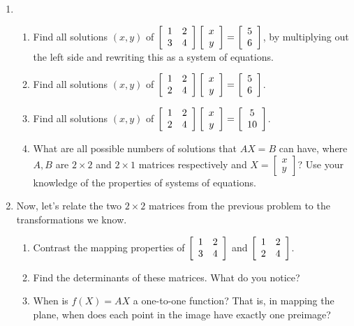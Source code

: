 \documentclass[../gatm.tex]{subfiles}
\begin{document}
\begin{enumerate}
\setcounter{enumi}{\value{problem_i}}
\item \begin{enumerate}
\item \label{prob:needed_for_matrix_undo3}Find all solutions $(x,y)$ of $\left[\begin{array}{cc} 1 & 2 \\ 3 & 4 \end{array}\right]\left[\begin{array}{c} x \\ y \end{array}\right]=\left[\begin{array}{c} 5 \\ 6 \end{array}\right]$, by multiplying out the left side and rewriting this as a system of equations.
\item \label{prob:needed_for_matrix_undo4}Find all solutions $(x,y)$ of $\left[\begin{array}{cc} 1 & 2 \\ 2 & 4 \end{array}\right]\left[\begin{array}{c} x \\ y \end{array}\right]=\left[\begin{array}{c} 5 \\ 6 \end{array}\right]$.
\item Find all solutions $(x,y)$ of $\left[\begin{array}{cc} 1 & 2 \\ 2 & 4 \end{array}\right]\left[\begin{array}{c} x \\ y \end{array}\right]=\left[\begin{array}{c} 5 \\ 10 \end{array}\right]$.
\item What are all possible numbers of solutions that $AX=B$ can have, where $A,B$ are $2\times 2$ and $2\times 1$ matrices respectively and $X=\left[\begin{array}{c} x \\ y \end{array}\right]$? Use your knowledge of the properties of systems of equations.
\end{enumerate}
\item Now, let's relate the two $2\times 2$ matrices from the previous problem to the transformations we know.
\begin{enumerate}
\item Contrast the mapping properties of $\left[\begin{array}{cc} 1 & 2 \\ 3 & 4 \end{array}\right]$ and $\left[\begin{array}{cc} 1 & 2 \\ 2 & 4 \end{array}\right]$.
\item Find the determinants of these matrices. What do you notice?
\item When is $f(X)=AX$ a one-to-one function? That is, in mapping the plane, when does each point in the image have exactly one preimage?

\end{enumerate}
\end{enumerate}
\end{document}
